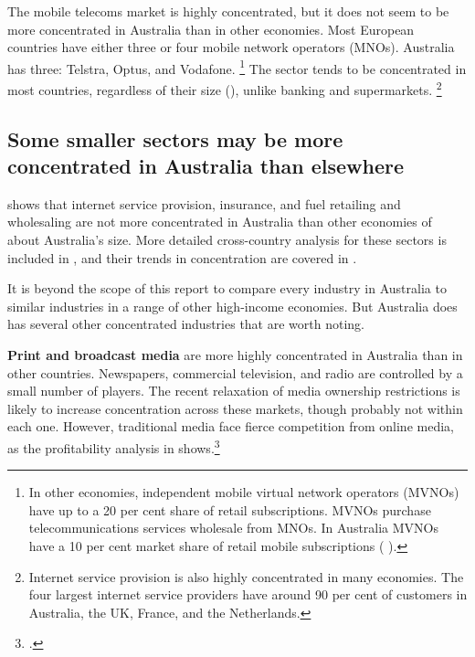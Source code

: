 The mobile telecoms market is highly concentrated, but it does not seem to be more concentrated in Australia than in other economies. Most European countries have either three or four mobile network operators (MNOs). Australia has three: Telstra, Optus, and Vodafone.%
\footnote{In other economies, independent mobile virtual network operators (MVNOs) have up to a 20 per cent share of retail subscriptions. MVNOs purchase telecommunications services wholesale from MNOs. In Australia MVNOs have a 10 per cent market share of retail mobile subscriptions ( \textcites{ACMA_Telco}{Netherlands_MVNO}).} %
The sector tends to be concentrated in most countries, regardless of their size (), unlike banking and supermarkets.%
\footnote{Internet service provision is also highly concentrated in many economies.
The four largest internet service providers have around 90 per cent of customers in Australia, the UK, France, and the Netherlands.}

\subsection{Some smaller sectors may be more concentrated in Australia than elsewhere}

 shows that internet service provision, insurance, and fuel retailing and wholesaling are not more concentrated in Australia than other economies of about Australia's size. More detailed cross-country analysis for these sectors is included in , and their trends in concentration are covered in .  

It is beyond the scope of this report to compare every industry in Australia to similar industries in a range of other high-income economies. But Australia does has several other concentrated industries that are worth noting. 


\textbf{Print and broadcast media} are more highly concentrated in Australia than in other countries. Newspapers, commercial television, and radio are controlled by a small number of players. The recent relaxation of media ownership restrictions is likely to increase concentration across these markets, though probably not within each one. However, traditional media face fierce competition from online media, as the profitability analysis in  shows.\footcite{Convo_media_2016}


